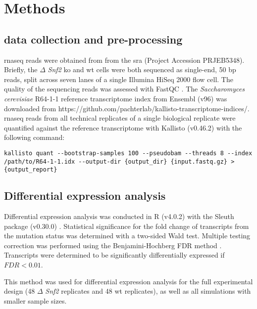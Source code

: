 \section{Methods}

\subsection{ data collection and pre-processing}

\Gls{rnaseq} reads were obtained from \cite[REF][]{gierlinskiStatisticalModelsRNAseq2015} from the \gls{sra} (Project Accession PRJEB5348).
Briefly, the $\Delta$ \emph{\emph{\emph{Snf2}}} \gls{ko} and \gls{wt} cells were both sequenced as single-end, 50 bp reads, split across seven lanes of a single Illumina HiSeq 2000 flow cell.
The quality of the sequencing reads was assessed with FastQC \cite{simonandrewsFastQCQualityControl2010}.
The \emph{Saccharomyces cerevisiae} R64-1-1 reference transcriptome index from Ensembl (v96) was downloaded from https://github.com/pachterlab/kallisto-transcriptome-indices/.
\Gls{rnaseq} reads from all technical replicates of a single biological replicate were quantified against the reference transcriptome with Kallisto (v0.46.2) \cite{brayNearoptimalProbabilisticRNAseq2016} with the following command:

\begin{lstlisting}[basicstyle=\ttfamily]
kallisto quant --bootstrap-samples 100 --pseudobam --threads 8 --index /path/to/R64-1-1.idx --output-dir {output_dir} {input.fastq.gz} > {output_report}
\end{lstlisting}

\subsection{Differential expression analysis}

Differential expression analysis was conducted in R (v4.0.2) \cite{rcoreteamLanguageEnvironmentStatistical2013} with the Sleuth package (v0.30.0) \cite{pimentelDifferentialAnalysisRNAseq2017,yiGenelevelDifferentialAnalysis2018}.
Statistical significance for the fold change of transcripts from the mutation status was determined with a two-sided Wald test.
Multiple testing correction was performed using the Benjamini-Hochberg FDR method \cite{benjaminiControllingFalseDiscovery1995}.
Transcripts were determined to be significantly differentially expressed if $FDR < 0.01$.

This method was used for differential expression analysis for the full experimental design (48 $\Delta$ \emph{Snf2} replicates and 48 \gls{wt} replicates), as well as all simulations with smaller sample sizes.

